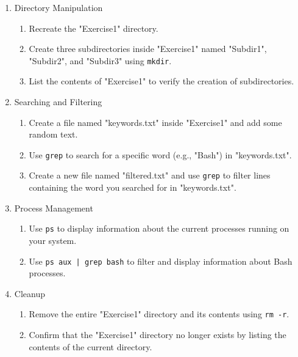 \begin{exerciseboxcomputer}
\begin{enumerate}
\begin{enumerate}
\end{enumerate}
\item Directory Manipulation
\begin{enumerate}
	\item Recreate the "Exercise1" directory.
	\item Create three subdirectories inside "Exercise1" named "Subdir1", "Subdir2", and "Subdir3" using \texttt{mkdir}.
	\item List the contents of "Exercise1" to verify the creation of subdirectories.
\end{enumerate}
\item Searching and Filtering
\begin{enumerate}
	\item Create a file named "keywords.txt" inside "Exercise1" and add some random text.
	\item Use \texttt{grep} to search for a specific word (e.g., "Bash") in "keywords.txt".
	\item Create a new file named "filtered.txt" and use \texttt{grep} to filter lines containing the word you searched for in "keywords.txt".
\end{enumerate}
\item Process Management
\begin{enumerate}
	\item Use \texttt{ps} to display information about the current processes running on your system.
	\item Use \texttt{ps aux | grep bash} to filter and display information about Bash processes.
\end{enumerate}
\item Cleanup
\begin{enumerate}
	\item Remove the entire "Exercise1" directory and its contents using \texttt{rm -r}.
	\item Confirm that the "Exercise1" directory no longer exists by listing the contents of the current directory.
\end{enumerate}
\end{enumerate}
\end{exerciseboxcomputer}

